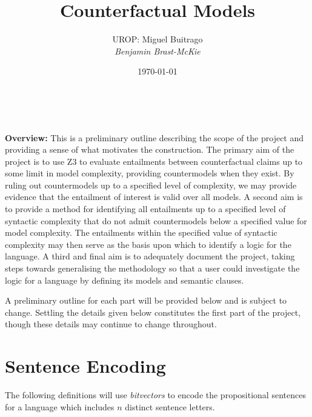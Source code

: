 \documentclass[a4paper, 11pt]{article} %
\title{\textbf{Counterfactual Models}} %
\author{\textsc{UROP:} Miguel Buitrago\\ \em Benjamin Brast-McKie} %
\date{\today} %
\makeatletter
\renewcommand{\L}[0]{\mathcal{L}}
\renewcommand{\maketitle}{ %
\begin{flushright} %
{\LARGE\@title} %

\vspace{10pt} %

{\@author} %
\\\@date %

\vspace{10pt} %
\end{flushright}
}
\makeatother
\begin{document}
\maketitle %

\thispagestyle{empty}



\noindent
\textbf{Overview:} 
This is a preliminary outline describing the scope of the project and providing a sense of what motivates the construction.
The primary aim of the project is to use Z3 to evaluate entailments between counterfactual claims up to some limit in model complexity, providing countermodels when they exist.
By ruling out countermodels up to a specified level of complexity, we may provide evidence that the entailment of interest is valid over all models.
A second aim is to provide a method for identifying all entailments up to a specified level of syntactic complexity that do not admit countermodels below a specified value for model complexity.
The entailments within the specified value of syntactic complexity may then serve as the basis upon which to identify a logic for the language.
A third and final aim is to adequately document the project, taking steps towards generalising the methodology so that a user could investigate the logic for a language by defining its models and semantic clauses. 

A preliminary outline for each part will be provided below and is subject to change.
Settling the details given below constitutes the first part of the project, though these details may continue to change throughout.






\section{Sentence Encoding}

The following definitions will use \textit{bitvectors} to encode the propositional sentences for a language which includes $n$ distinct sentence letters.
\end{document}
